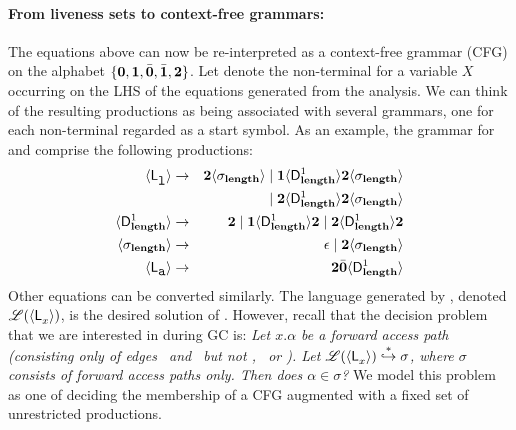 \documentclass[9pt,preprint,letter,nonatbib]{sigplanconf}
\begin{document}
\paragraph{From liveness sets to context-free grammars:}\label{sec:grammar-formulation}      
The  equations  above can  now  be  re-interpreted as  a  context-free
grammar  (CFG) on  the  alphabet $\lbrace\mathbf{0},  \mathbf{1}, \bar{\mathbf{0}},  \bar{\mathbf{1}},
{\mathbf{2}}\rbrace$.  Let  denote  the non-terminal for a variable
$X$ occurring on the LHS of the equations generated from the analysis.
We can  think of  the resulting productions  as being  associated with
several grammars, one for  each non-terminal  regarded
as a start symbol.  As  an example, the grammar for \var{\Lanv{\xl}{}}
and \var{\Lanv{\pa}{}} comprise the following productions:
\begin{eqnarray*}
  \langle \mathsf{L}_{{\mbox{\tt l}}}^{}\rangle  &\rightarrow& 
  {\mathbf{2}}\langle \sigma_{\mathbf{length}}\rangle \mid \mathbf{1} \langle \mathsf{D}_{\mathit {\mathbf{length}}}^{1}\rangle{\ensuremath{{\mathbf{2}}}\ensuremath{\langle \sigma_{\mathbf{length}}\rangle}}  \\ && \mid
  {\mathbf{2}}\langle \mathsf{D}_{\mathit {\mathbf{length}}}^{1}\rangle{\ensuremath{{\mathbf{2}}}\ensuremath{\langle \sigma_{\mathbf{length}}\rangle}} \\
  \langle \mathsf{D}_{\mathit {\mathbf{length}}}^{1}\rangle &\rightarrow& {\mathbf{2}} \mid
  \mathbf{1}\langle \mathsf{D}_{\mathit {\mathbf{length}}}^{1}\rangle{\mathbf{2}}
       \mid {\mathbf{2}}\langle \mathsf{D}_{\mathit {\mathbf{length}}}^{1}\rangle{\ensuremath{{\mathbf{2}}}}\\
\langle {\sigma_{\ensuremath{\mathbf{length}}}} \rangle
&\rightarrow&
\epsilon  \mid {\mathbf{2}}\langle{\sigma_{\ensuremath{\mathbf{length}}}}\rangle \\
\langle \mathsf{L}_{{\mbox{\tt a}}}^{}\rangle &\rightarrow& {\mathbf{2}} \bar{\mathbf{0}} \langle \mathsf{D}_{\mathit {\mathbf{length}}}^{1}\rangle
\end{eqnarray*}
Other  equations  can   be  converted  similarly.   The
language   generated   by  ,   denoted
$\mathscr{L}(\langle \mathsf{L}_{{x}}^{}\rangle)$,   is    the   desired
solution  of  .    
However, recall that the decision problem that we are interested in
during GC is: 
{\em
Let $x.\alpha$ be a forward access path (consisting only
of edges  \acar\ and \acdr\  but not \bcar,  \bcdr\ or
\clazy).       Let      $\mathscr{L}(\langle \mathsf{L}_{{x}}^{}\rangle)
\stackrel{*}{\hookrightarrow}  \sigma$, where  $\sigma$
consists  of  forward  access  paths  only.  Then  does
$\alpha \in \sigma$?
}
We model  this problem as one  of deciding the
membership of  a CFG augmented  with a
fixed set of unrestricted productions.
\end{document}
